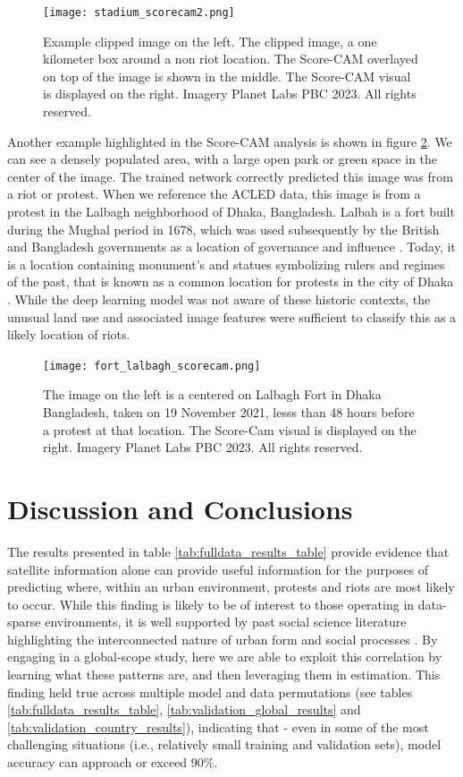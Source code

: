 \begin{figure}
    \centering
    \texttt{[image: stadium\_scorecam2.png]}
    \caption{Example clipped image on the left.  The clipped image, a one kilometer box around a non riot location.  The Score-CAM overlayed on top of the image is shown in the middle.  The Score-CAM visual is displayed on the right. Imagery \textcopyright Planet Labs PBC 2023. All rights reserved. }
    \label{fig:score_cam_stadium2}
\end{figure}

Another example highlighted in the Score-CAM analysis is shown in figure \ref{fig:fort_lalbagh}.  We can see a densely populated area, with a large open park or green space in the center of the image.  The trained network correctly predicted this image was from a riot or protest.  When we reference the ACLED data, this image is from a protest in the Lalbagh neighborhood of Dhaka, Bangladesh.  Lalbah is a fort built during the Mughal period in 1678, which was used subsequently by the British and Bangladesh governments as a location of governance and influence \citep{shakur2010culture}. Today, it is a location containing monument's and statues symbolizing rulers and regimes of the past, that is known as a common location for protests in the city of Dhaka \citep{begum2018changing}. While the deep learning model was not aware of these historic contexts, the unusual land use and associated image features were sufficient to classify this as a likely location of riots.

\begin{figure}
    \centering
    \texttt{[image: fort\_lalbagh\_scorecam.png]}
    \caption{The image on the left is a centered on Lalbagh Fort in Dhaka Bangladesh, taken on 19 November 2021, lesss than 48 hours before a protest at that location.  The Score-Cam visual is displayed on the right. Imagery \textcopyright Planet Labs PBC 2023. All rights reserved. }
    \label{fig:fort_lalbagh}
\end{figure}

\section{Discussion and Conclusions}
The results presented in table \ref{tab:fulldata_results_table} provide evidence that satellite information alone can provide useful information for the purposes of predicting where, within an urban environment, protests and riots are most likely to occur.  While this finding is likely to be of interest to those operating in data-sparse environments, it is well supported by past social science literature highlighting the interconnected nature of urban form and social processes \citep{fox2016urban,begum2018changing}.  By engaging in a global-scope study, here we are able to exploit this correlation by learning what these patterns are, and then leveraging them in estimation.  This finding held true across multiple model and data permutations (see tables \ref{tab:fulldata_results_table}, \ref{tab:validation_global_results} and \ref{tab:validation_country_results}), indicating that - even in some of the most challenging situations (i.e., relatively small training and validation sets), model accuracy can approach or exceed 90\%.

